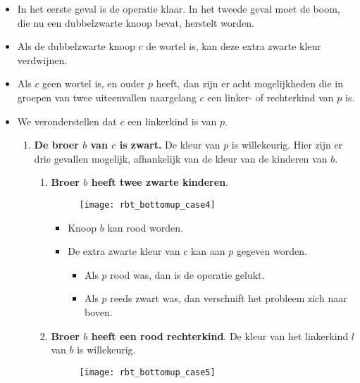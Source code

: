 \begin{itemize}
    \item In het eerste geval is de operatie klaar. In het tweede geval moet de boom, die nu een dubbelzwarte knoop bevat, herstelt worden.
    \item Als de dubbelzwarte knoop $c$ de wortel is, kan deze extra zwarte kleur verdwijnen. 
    \item Als $c$ geen wortel is, en ouder $p$ heeft, dan zijn er acht mogelijkheden die in groepen van twee uiteenvallen naargelang $c$ een linker- of rechterkind van $p$ is.
    \item We veronderstellen dat $c$ een linkerkind is van $p$.
    \begin{enumerate}
        \item \textbf{De broer $b$ van $c$ is zwart.} De kleur van $p$ is willekeurig. Hier zijn er drie gevallen mogelijk, afhankelijk van de kleur van de kinderen van $b$.
        \begin{enumerate}
            \item \textbf{Broer $b$ heeft twee zwarte kinderen}.
            \begin{figure}[ht]
                \centering
                \texttt{[image: rbt\_bottomup\_case4]}
                \caption{}
                \label{fig:rbt_bottomup_case4}
            \end{figure}
            \begin{itemize}
                \item Knoop $b$ kan rood worden.
                \item De extra zwarte kleur van $c$ kan aan $p$ gegeven worden.
                \begin{itemize}
                    \item Als $p$ rood was, dan is de operatie gelukt.
                    \item Als $p$ reeds zwart was, dan verschuift het probleem zich naar boven.
                \end{itemize}
            \end{itemize}
            \item \textbf{Broer $b$ heeft een rood rechterkind}. De kleur van het linkerkind $l$ van $b$ is willekeurig.
            \begin{figure}[ht]
                \centering
                \texttt{[image: rbt\_bottomup\_case5]}
                \caption{}
                \label{fig:rbt_bottomup_case5}
            \end{figure}
            \begin{itemize}

\end{itemize}
\end{enumerate}
\end{enumerate}
\end{itemize}
